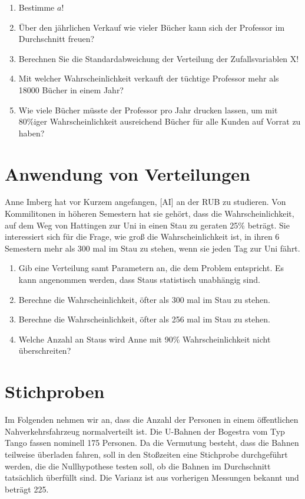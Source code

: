\documentclass[11pt, a4paper]{article}
\begin{document}
\begin{enumerate}[label=\alph*)]
\item 	Bestimme $a$!\\
\item   Über den jährlichen Verkauf wie vieler Bücher kann sich der Professor im Durchschnitt freuen?
\item   Berechnen Sie die Standardabweichung der Verteilung der Zufallsvariablen X!
\item   Mit welcher Wahrscheinlichkeit verkauft der tüchtige Professor mehr als 18000 Bücher in einem Jahr?
\item   Wie viele Bücher müsste der Professor pro Jahr drucken lassen, um mit 80\%iger Wahrscheinlichkeit ausreichend Bücher für alle Kunden auf Vorrat zu haben?
\end{enumerate}

\newpage
\section{Anwendung von Verteilungen}
Anne Imberg hat vor Kurzem angefangen, \textcolor{AI-BLUE}{[AI]} an der RUB zu studieren. Von Kommilitonen in höheren Semestern hat sie gehört, dass die Wahrscheinlichkeit, auf dem Weg von Hattingen zur Uni in einen Stau zu geraten 25\% beträgt. Sie interessiert sich für die Frage, wie groß die Wahrscheinlichkeit ist, in ihren 6 Semestern mehr als 300 mal im Stau zu stehen, wenn sie jeden Tag zur Uni fährt.

\begin{enumerate}[label=\alph*)]
	\item Gib eine Verteilung samt Parametern an, die dem Problem entspricht. Es kann angenommen werden, dass Staus statistisch unabhängig sind.
	\item Berechne die Wahrscheinlichkeit, öfter als 300 mal im Stau zu stehen.
	\item Berechne die Wahrscheinlichkeit, öfter als 256 mal im Stau zu stehen.
	\item Welche Anzahl an Staus wird Anne mit 90\% Wahrscheinlichkeit nicht überschreiten?
\end{enumerate}

\newpage
\section{Stichproben} %

Im Folgenden nehmen wir an, dass die Anzahl der Personen in einem öffentlichen Nahverkehrsfahrzeug normalverteilt ist. Die U-Bahnen der Bogestra vom Typ Tango fassen nominell 175 Personen. Da die Vermutung besteht, dass die Bahnen teilweise überladen fahren, soll in den Stoßzeiten eine Stichprobe durchgeführt werden, die die Nullhypothese testen soll, ob die Bahnen im Durchschnitt tatsächlich überfüllt sind. Die Varianz ist aus vorherigen Messungen bekannt und beträgt 225.
\end{document}
